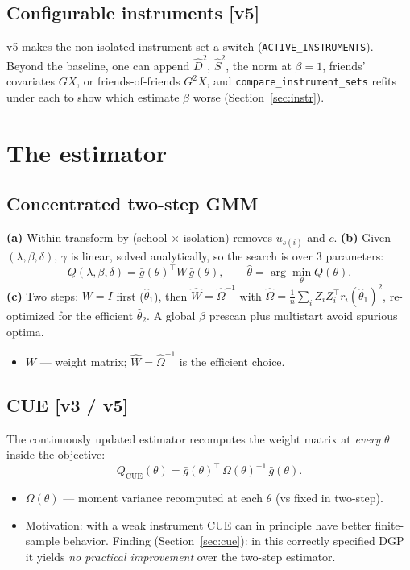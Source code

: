 \documentclass[11pt]{article}
\newcommand{\T}{^{\!\top}}
\newenvironment{where}{\par\nobreak\vspace{-0.2em}\begin{itemize}[leftmargin=1.5em,itemsep=1pt,topsep=2pt,parsep=0pt,label=\textcolor{accent}{\textbullet}]\small}{\end{itemize}\vspace{0.2em}}
\begin{document}
\subsection{Configurable instruments [v5]}
v5 makes the non-isolated instrument set a switch (\texttt{ACTIVE\_INSTRUMENTS}). Beyond the baseline, one can append $\widehat D^2$, $\widehat S^2$, the norm at $\beta=1$, friends' covariates $GX$, or friends-of-friends $G^2X$, and \texttt{compare\_instrument\_sets} refits under each to show which estimate $\beta$ worse (Section~\ref{sec:instr}).

\section{The estimator}
\subsection{Concentrated two-step GMM}
\textbf{(a)} Within transform by (school $\times$ isolation) removes $u_{s(i)}$ and $c$.
\textbf{(b)} Given $(\lambda,\beta,\delta)$, $\gamma$ is linear, solved analytically, so the search is over 3 parameters:
\begin{equation}
Q(\lambda,\beta,\delta)=\bar g(\theta)\T W\,\bar g(\theta),\qquad \hat\theta=\arg\min_\theta Q(\theta).
\end{equation}
\textbf{(c)} Two steps: $W=I$ first ($\hat\theta_1$), then $\widehat W=\widehat\Omega^{-1}$ with $\widehat\Omega=\tfrac1n\sum_i Z_iZ_i\T r_i(\hat\theta_1)^2$, re-optimized for the efficient $\hat\theta_2$. A global $\beta$ prescan plus multistart avoid spurious optima.
\begin{where}
\item $W$ --- weight matrix; $\widehat W=\widehat\Omega^{-1}$ is the efficient choice.
\end{where}

\subsection{CUE [v3 / v5]}
The continuously updated estimator recomputes the weight matrix at \emph{every} $\theta$ inside the objective:
\begin{equation}
Q_{\text{CUE}}(\theta)=\bar g(\theta)\T\,\Omega(\theta)^{-1}\,\bar g(\theta).
\end{equation}
\begin{where}
\item $\Omega(\theta)$ --- moment variance recomputed at each $\theta$ (vs fixed in two-step).
\item Motivation: with a weak instrument CUE can in principle have better finite-sample behavior. Finding (Section~\ref{sec:cue}): in this correctly specified DGP it yields \emph{no practical improvement} over the two-step estimator.
\end{where}
\end{document}
